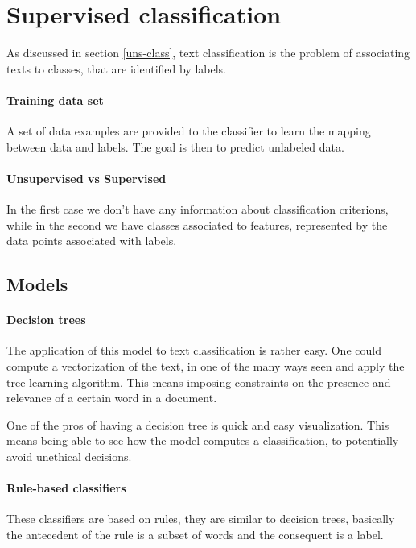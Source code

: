 \section{Supervised classification}

As discussed in section \vref{uns-class}, text classification is the 
problem of associating texts to classes, that are identified by labels.

\paragraph{Training data set}
A set of data examples are provided to the classifier to learn 
the mapping between data and labels. The goal is then to 
predict unlabeled data.

\paragraph{Unsupervised vs Supervised}
In the first case we don't have any information about 
classification criterions, while in the second we have classes 
associated to features, represented by the data points associated with 
labels.

\subsection{Models}

\paragraph{Decision trees}
The application of this model to text classification is rather 
easy. 
One could compute a vectorization of the text, in one of the many ways
seen and apply the tree learning algorithm.
This means imposing constraints on the presence and relevance 
of a certain word in a document.

One of the pros of having a decision tree is quick and easy visualization.
This means being able to see how the model computes a classification, 
to potentially avoid unethical decisions.

\paragraph{Rule-based classifiers}
These classifiers are based on rules, they are similar to 
decision trees, basically the antecedent of 
the rule is a subset of words and the consequent is a label.


